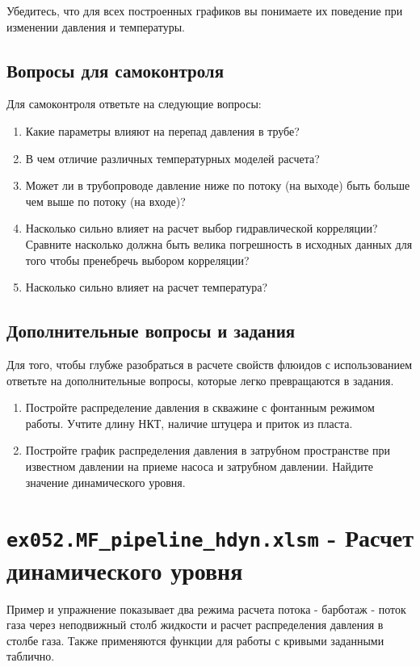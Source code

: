 Убедитесь, что для всех построенных графиков вы понимаете их поведение при изменении давления и температуры. 

\subsection{Вопросы для самоконтроля}
Для самоконтроля ответьте на следующие вопросы:

\begin{enumerate}
	
	\item Какие параметры влияют на перепад давления в трубе?
	\item В чем отличие различных температурных моделей расчета?
	\item Может ли в трубопроводе давление ниже по потоку (на выходе) быть больше чем выше по потоку (на входе)?
	\item Насколько сильно влияет на расчет выбор гидравлической корреляции? Сравните насколько должна быть велика погрешность в исходных данных для того чтобы пренебречь выбором корреляции?
	\item Насколько сильно влияет на расчет температура?
					 
	
\end{enumerate}

\subsection{Дополнительные вопросы и задания}

Для того, чтобы глубже разобраться в расчете свойств флюидов с использованием \unf{} ответьте на дополнительные вопросы, которые легко превращаются в задания.

\begin{enumerate}
	
	\item Постройте распределение давления в скважине с фонтанным режимом работы. Учтите длину НКТ, наличие штуцера и приток из пласта.
	\item Постройте график распределения давления в затрубном пространстве при известном давлении на приеме насоса и затрубном давлении. Найдите значение динамического уровня.

\end{enumerate}


\section{\texttt{ex052.MF_pipeline_hdyn.xlsm} - Расчет динамического уровня}
Пример и упражнение показывает два режима расчета потока - барботаж - поток газа через неподвижный столб жидкости и расчет распределения давления в столбе газа. Также применяются функции для работы с кривыми заданными таблично.

